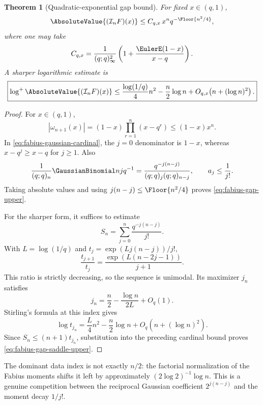 \documentclass[11pt,oneside]{book}
\numberwithin{equation}{chapter}
\newtheorem{theorem}{Theorem}[chapter]
\theoremstyle{definition}
\theoremstyle{remark}
\newcommand{\Interp}{\mathcal I}
\begin{document}
\begin{theorem}[Quadratic-exponential gap bound]
\label{thm:fabius-gap-upper}
For fixed $x\in(q,1)$,
\begin{equation}
 \AbsoluteValue{(\Interp_nF)(x)}
 \le C_{q,x}\,x^n q^{-\Floor{n^2/4}},
 \label{eq:fabius-gap-upper}
\end{equation}
where one may take
\begin{equation}
 C_{q,x}=\frac1{(q;q)_\infty^2}
 \left(1+\frac{\EulerE(1-x)}{x-q}\right).
 \label{eq:fabius-gap-constant}
\end{equation}
A sharper logarithmic estimate is
\begin{equation}
 \boxed{
 \log^+\AbsoluteValue{(\Interp_nF)(x)}
 \le \frac{\log(1/q)}4n^2-\frac n2\log n
      +O_{q,x}\!\left(n+(\log n)^2\right).}
 \label{eq:fabius-gap-saddle-upper}
\end{equation}
\end{theorem}

\begin{proof}
For $x\in(q,1)$,
\[
 |\omega_{n+1}(x)|
 =(1-x)\prod_{r=1}^{n}(x-q^r)
 \le(1-x)x^n.
\]
In \eqref{eq:fabius-gaussian-cardinal}, the $j=0$ denominator is $1-x$,
whereas $x-q^j\ge x-q$ for $j\ge1$.  Also
\[
 \frac1{(q;q)_n}\GaussianBinomial nj{q^{-1}}
 =\frac{q^{-j(n-j)}}{(q;q)_j(q;q)_{n-j}},
 \qquad a_j\le\frac1{j!}.
\]
Taking absolute values and using
$j(n-j)\le\Floor{n^2/4}$ proves
\eqref{eq:fabius-gap-upper}.

For the sharper form, it suffices to estimate
\[
 S_n=\sum_{j=0}^{n}\frac{q^{-j(n-j)}}{j!}.
\]
With $L=\log(1/q)$ and
$t_j=\exp(Lj(n-j))/j!$,
\begin{equation}
 \frac{t_{j+1}}{t_j}
 =\frac{\exp(L(n-2j-1))}{j+1}.
 \label{eq:fabius-saddle-ratio}
\end{equation}
This ratio is strictly decreasing, so the sequence is unimodal.  Its
maximizer $j_n$ satisfies
\begin{equation}
 j_n=\frac n2-\frac{\log n}{2L}+O_q(1).
 \label{eq:fabius-saddle-location}
\end{equation}
Stirling's formula at this index gives
\[
 \log t_{j_n}
 =\frac L4n^2-\frac n2\log n
   +O_q\!\left(n+(\log n)^2\right).
\]
Since $S_n\le(n+1)t_{j_n}$, substitution into the preceding cardinal bound
proves \eqref{eq:fabius-gap-saddle-upper}.
\end{proof}

The dominant data index is not exactly $n/2$: the factorial normalization of
the Fabius moments shifts it left by approximately
$(2\log2)^{-1}\log n$.  This is a genuine competition between the reciprocal
Gaussian coefficient $2^{j(n-j)}$ and the moment decay $1/j!$.
\end{document}
